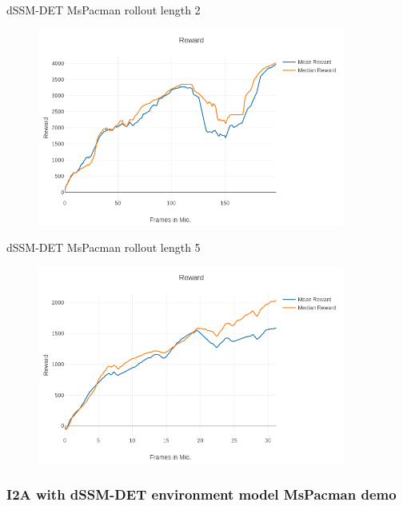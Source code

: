 \begin{frame}{dSSM-DET MsPacman rollout length 2}
	\vspace{-10mm}
    \begin{figure}
        \centering
        \includegraphics[width=0.9\textwidth]{./latent_i2a_images/MsPacman-rollouts2-longtrained-smoothed.png}
    \end{figure}
\end{frame}

\begin{frame}{dSSM-DET MsPacman rollout length 5}
	\vspace{-10mm}
    \begin{figure}
        \centering
        \includegraphics[width=0.9\textwidth]{./latent_i2a_images/MsPacman-rollouts5_dSSM_DET.png}
    \end{figure}
\end{frame}


\begin{frame}
	\frametitle{I2A with dSSM-DET environment model MsPacman demo}
\end{frame}



